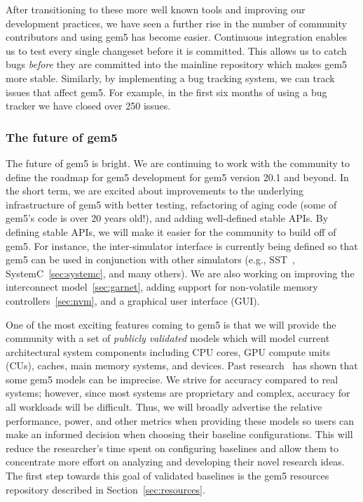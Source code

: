 After transitioning to these more well known tools and improving our development practices, we have seen a further rise in the number of community contributors and using gem5 has become easier.
Continuous integration enables us to test every single changeset before it is committed.
This allows us to catch bugs \emph{before} they are committed into the mainline repository which makes gem5 more stable.
Similarly, by implementing a bug tracking system, we can track issues that affect gem5.
For example, in the first six months of using a bug tracker we have closed over 250 issues.

\subsubsection*{The future of gem5}
The future of gem5 is bright.
We are continuing to work with the community to define the roadmap for gem5 development for gem5 version 20.1 and beyond.
In the short term, we are excited about improvements to the underlying infrastructure of gem5 with better testing, refactoring of aging code (some of gem5's code is over 20 years old!), and adding well-defined stable APIs.
By defining stable APIs, we will make it easier for the community to build off of gem5.
For instance, the inter-simulator interface is currently being defined so that gem5 can be used in conjunction with other simulators (e.g., SST~\cite{RodriguesHemmert2011-sst, HsiehPedretti2012-sst-gem5}, SystemC~\ref{sec:systemc}, and many others).
We are also working on improving the interconnect model~\ref{sec:garnet}, adding support for non-volatile memory controllers~\ref{sec:nvm}, and a graphical user interface (GUI).

One of the most exciting features coming to gem5 is that we will provide the community with a set of \emph{publicly validated} models which will model current architectural system components including CPU cores, GPU compute units (CUs), caches, main memory systems, and devices.
Past research~\cite{butko2012accuracy, nowatzki2015architectural, endo2014micro, akram201686, asri2016simulator, akram2019validation, gutierrez2014sources, jo2018diagsim, tanimoto2017dependence, walker2018hardware} has shown that some gem5 models can be imprecise.
We strive for accuracy compared to real systems; however, since most systems are proprietary and complex, accuracy for all workloads will be difficult.
Thus, we will broadly advertise the relative performance, power, and other metrics when providing these models so users can make an informed decision when choosing their baseline configurations.
This will reduce the researcher's time spent on configuring baselines and allow them to concentrate more effort on analyzing and developing their novel research ideas.
The first step towards this goal of validated baselines is the gem5 resources repository described in Section~\ref{sec:resources}.

